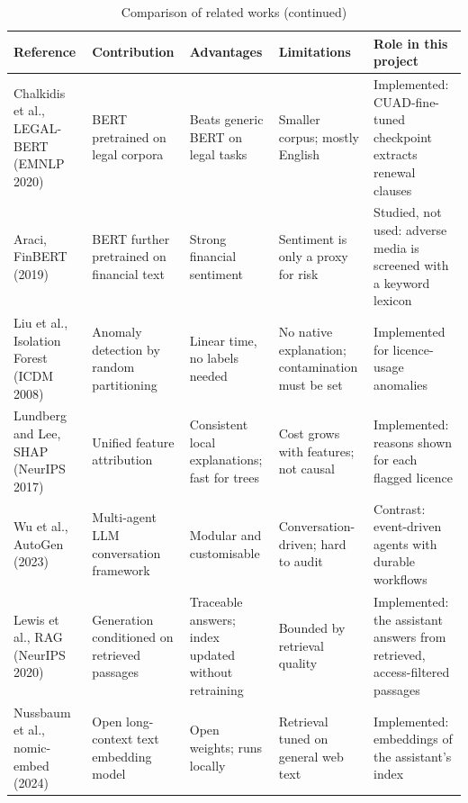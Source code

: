 \begin{table}[!htbp]
\centering\tablestyle
\caption{Comparison of related works (continued)}\label{tab:related2}
\begin{tabularx}{\textwidth}{|L{0.16\textwidth}|L{0.18\textwidth}|L{0.16\textwidth}|L{0.17\textwidth}|Y|}
\hline
\textbf{Reference} & \textbf{Contribution} & \textbf{Advantages} & \textbf{Limitations} & \textbf{Role in this project} \\ \hline
Chalkidis et al., LEGAL-BERT (EMNLP 2020)~\cite{chalkidis2020legalbert} & BERT pretrained on legal corpora & Beats generic BERT on legal tasks & Smaller corpus; mostly English & Implemented: CUAD-fine-tuned checkpoint extracts renewal clauses \\ \hline
Araci, FinBERT (2019)~\cite{araci2019finbert} & BERT further pretrained on financial text & Strong financial sentiment & Sentiment is only a proxy for risk & Studied, not used: adverse media is screened with a keyword lexicon \\ \hline
Liu et al., Isolation Forest (ICDM 2008)~\cite{liu2008isolation} & Anomaly detection by random partitioning & Linear time, no labels needed & No native explanation; contamination must be set & Implemented for licence-usage anomalies \\ \hline
Lundberg and Lee, SHAP (NeurIPS 2017)~\cite{lundberg2017shap} & Unified feature attribution & Consistent local explanations; fast for trees & Cost grows with features; not causal & Implemented: reasons shown for each flagged licence \\ \hline
Wu et al., AutoGen (2023)~\cite{wu2023autogen} & Multi-agent LLM conversation framework & Modular and customisable & Conversation-driven; hard to audit & Contrast: event-driven agents with durable workflows \\ \hline
Lewis et al., RAG (NeurIPS 2020)~\cite{lewis2020rag} & Generation conditioned on retrieved passages & Traceable answers; index updated without retraining & Bounded by retrieval quality & Implemented: the assistant answers from retrieved, access-filtered passages \\ \hline
Nussbaum et al., nomic-embed (2024)~\cite{nussbaum2024nomic} & Open long-context text embedding model & Open weights; runs locally & Retrieval tuned on general web text & Implemented: embeddings of the assistant's index \\ \hline
\end{tabularx}
\end{table}

